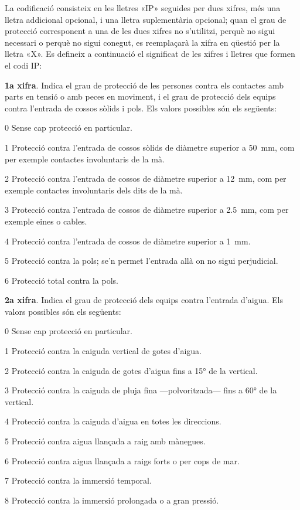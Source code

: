 La codificació consisteix en les lletres «IP»
seguides per dues xifres, més una lletra addicional opcional, i una
lletra suplementària opcional; quan el grau de protecció
corresponent a una de les dues xifres no s'utilitzi, perquè no sigui
necessari o perquè no sigui conegut, es reemplaçarà la xifra en
qüestió per la lletra «X». Es defineix a continuació el
significat de les xifres i lletres que formen el codi IP:

\textbf{1a xifra}. Indica el grau de protecció de les persones contra els contactes amb
parts en tensió o amb peces en moviment, i el grau de protecció dels equips contra l'entrada de cossos sòlids i pols. Els valors possibles són els següents:
\begin{list}{}
   {\setlength{\labelwidth}{10mm} \setlength{\leftmargin}{15mm} \setlength{\labelsep}{5mm}}
   \item[0] Sense cap protecció en particular.
   \item[1]Protecció contra l'entrada de cossos sòlids de diàmetre superior a \qty{50}{mm},
   com per exemple   contactes involuntaris de la mà.
   \item[2] Protecció contra l'entrada de cossos de diàmetre superior a \qty{12}{mm}, com per exemple
   contactes involuntaris dels dits de la mà.
   \item[3] Protecció contra l'entrada de cossos de diàmetre superior a \qty{2,5}{mm},
   com per exemple eines o cables.
   \item[4] Protecció contra l'entrada de cossos de diàmetre superior a \qty{1}{mm}.
   \item[5] Protecció contra la pols; se'n permet l'entrada allà on no sigui perjudicial.
   \item[6] Protecció total contra la pols.
\end{list}

\textbf{2a xifra}. Indica el grau de protecció dels equips contra
l'entrada d'aigua. Els valors possibles són els següents:
\begin{list}{}
   {\setlength{\labelwidth}{10mm} \setlength{\leftmargin}{15mm} \setlength{\labelsep}{5mm}}
   \item[0] Sense cap protecció en particular.
   \item[1] Protecció contra la caiguda vertical de gotes d'aigua.
   \item[2] Protecció contra la caiguda de gotes d'aigua fins a \ang{15} de la  vertical.
   \item[3] Protecció contra la caiguda de pluja fina ---polvoritzada--- fins a \ang{60} de la  vertical.
   \item[4] Protecció contra la caiguda d'aigua en totes les direccions.
   \item[5] Protecció contra aigua llançada a raig amb mànegues.
   \item[6] Protecció contra aigua llançada a raigs forts o per cops de mar.
   \item[7] Protecció contra la immersió temporal.
   \item[8] Protecció contra la immersió prolongada o a gran pressió.
\end{list}


